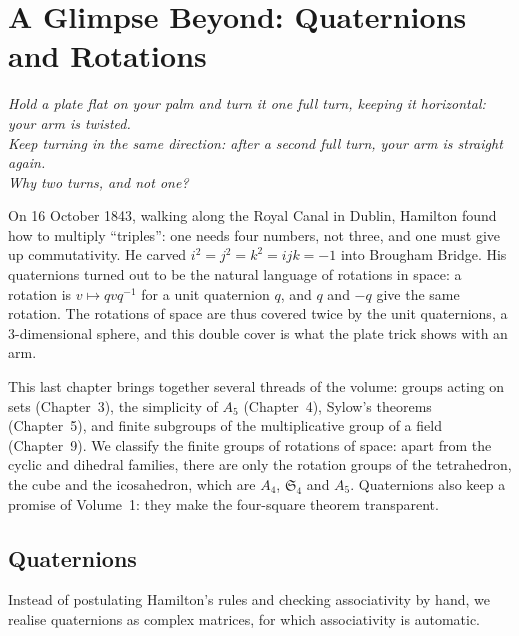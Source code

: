 \chapter{A Glimpse Beyond: Quaternions and Rotations}

\begin{center}\itshape
Hold a plate flat on your palm and turn it one full turn, keeping it horizontal: your arm is twisted.\\
Keep turning in the same direction: after a second full turn, your arm is straight again.\\
Why two turns, and not one?
\end{center}

On 16 October 1843, walking along the Royal Canal in Dublin, Hamilton found how to multiply ``triples'': one needs four numbers, not three, and one must give up commutativity. He carved $i^2=j^2=k^2=ijk=-1$ into Brougham Bridge. His quaternions turned out to be the natural language of rotations in space: a rotation is $v\mapsto qvq^{-1}$ for a unit quaternion $q$, and $q$ and $-q$ give the same rotation. The rotations of space are thus covered twice by the unit quaternions, a $3$-dimensional sphere, and this double cover is what the plate trick shows with an arm.

This last chapter brings together several threads of the volume: groups acting on sets (Chapter~3), the simplicity of $A_5$ (Chapter~4), Sylow's theorems (Chapter~5), and finite subgroups of the multiplicative group of a field (Chapter~9). We classify the finite groups of rotations of space: apart from the cyclic and dihedral families, there are only the rotation groups of the tetrahedron, the cube and the icosahedron, which are $A_4$, $\mathfrak S_4$ and $A_5$. Quaternions also keep a promise of Volume~1: they make the four-square theorem transparent.

\section{Quaternions}

Instead of postulating Hamilton's rules and checking associativity by hand, we realise quaternions as complex matrices, for which associativity is automatic.

